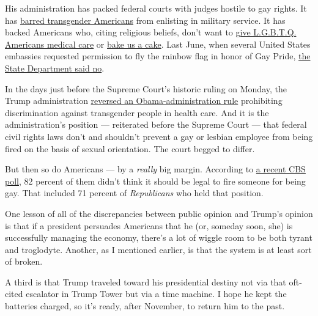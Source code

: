 His administration has packed federal courts with judges hostile to gay
rights. It has
\href{https://www.nbcnews.com/feature/nbc-out/trump-s-controversial-transgender-military-policy-goes-effect-n993826}{barred
transgender Americans} from enlisting in military service. It has backed
Americans who, citing religious beliefs, don't want to
\href{https://www.nytimes.com/2019/05/02/upshot/conscience-rule-trump-religious-exemption-health-care.html}{give
L.G.B.T.Q. Americans medical care} or
\href{https://www.washingtonpost.com/politics/courts_law/in-major-supreme-court-case-justice-dept-sides-with-baker-who-refused-to-make-wedding-cake-for-gay-couple/2017/09/07/fb84f116-93f0-11e7-89fa-bb822a46da5b_story.html?utm_term=.b9009191c100}{bake
us a cake}. Last June, when several United States embassies requested
permission to fly the rainbow flag in honor of Gay Pride,
\href{https://www.nbcnews.com/politics/national-security/trump-admin-tells-u-s-embassies-they-can-t-fly-n1015236}{the
State Department said no}.

In the days just before the Supreme Court's historic ruling on Monday,
the Trump administration
\href{https://www.nytimes.com/2020/06/12/us/politics/trump-transgender-rights.html}{reversed
an Obama-administration rule} prohibiting discrimination against
transgender people in health care. And it is the administration's
position --- reiterated before the Supreme Court --- that federal civil
rights laws don't and shouldn't prevent a gay or lesbian employee from
being fired on the basis of sexual orientation. The court begged to
differ.

But then so do Americans --- by a \emph{really} big margin. According to
\href{https://www.cbsnews.com/news/supreme-court-opinion-poll-cbs-news/}{a
recent CBS poll}, 82 percent of them didn't think it should be legal to
fire someone for being gay. That included 71 percent of
\emph{Republicans} who held that position.

One lesson of all of the discrepancies between public opinion and
Trump's opinion is that if a president persuades Americans that he (or,
someday soon, she) is successfully managing the economy, there's a lot
of wiggle room to be both tyrant and troglodyte. Another, as I mentioned
earlier, is that the system is at least sort of broken.

A third is that Trump traveled toward his presidential destiny not via
that oft-cited escalator in Trump Tower but via a time machine. I hope
he kept the batteries charged, so it's ready, after November, to return
him to the past.

